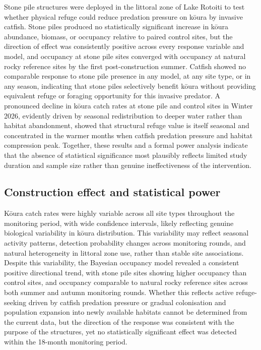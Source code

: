 \documentclass[
  12pt,
  a4paper,
  oneside]{scrbook}
\begin{document}
Stone pile structures were deployed in the littoral zone of Lake Rotoiti
to test whether physical refuge could reduce predation pressure on kōura
by invasive catfish. Stone piles produced no statistically significant
increase in kōura abundance, biomass, or occupancy relative to paired
control sites, but the direction of effect was consistently positive
across every response variable and model, and occupancy at stone pile
sites converged with occupancy at natural rocky reference sites by the
first post-construction summer. Catfish showed no comparable response to
stone pile presence in any model, at any site type, or in any season,
indicating that stone piles selectively benefit kōura without providing
equivalent refuge or foraging opportunity for this invasive predator. A
pronounced decline in kōura catch rates at stone pile and control sites
in Winter 2026, evidently driven by seasonal redistribution to deeper
water rather than habitat abandonment, showed that structural refuge
value is itself seasonal and concentrated in the warmer months when
catfish predation pressure and habitat compression peak. Together, these
results and a formal power analysis indicate that the absence of
statistical significance most plausibly reflects limited study duration
and sample size rather than genuine ineffectiveness of the intervention.

\subsection{Construction effect and statistical
power}\label{construction-effect-and-statistical-power}

Kōura catch rates were highly variable across all site types throughout
the monitoring period, with wide confidence intervals, likely reflecting
genuine biological variability in kōura distribution. This variability
may reflect seasonal activity patterns, detection probability changes
across monitoring rounds, and natural heterogeneity in littoral zone
use, rather than stable site associations. Despite this variability, the
Bayesian occupancy model revealed a consistent positive directional
trend, with stone pile sites showing higher occupancy than control
sites, and occupancy comparable to natural rocky reference sites across
both summer and autumn monitoring rounds. Whether this reflects active
refuge-seeking driven by catfish predation pressure or gradual
colonisation and population expansion into newly available habitats
cannot be determined from the current data, but the direction of the
response was consistent with the purpose of the structures, yet no
statistically significant effect was detected within the 18-month
monitoring period.
\end{document}
